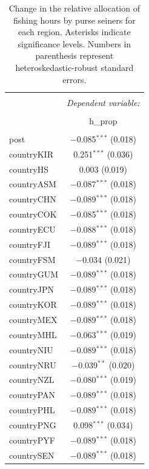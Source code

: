 \documentclass[12pt,]{article}
\begin{document}
\begin{table}[!htbp] \centering 
  \caption{\label{tab:disp_mod}Change in the relative allocation of fishing hours by purse seiners for each region. Asterisks indicate significance levels. Numbers in parenthesis represent heteroskedastic-robust standard errors.} 
  \label{} 
\begin{tabular}{@{\extracolsep{5pt}}lc} 
\\[-1.8ex]\hline 
\hline \\[-1.8ex] 
 & \multicolumn{1}{c}{\textit{Dependent variable:}} \\ 
\cline{2-2} 
\\[-1.8ex] & h\_prop \\ 
\hline \\[-1.8ex] 
 post & $-$0.085$^{***}$ (0.018) \\ 
  countryKIR & 0.251$^{***}$ (0.036) \\ 
  countryHS & 0.003 (0.019) \\ 
  countryASM & $-$0.087$^{***}$ (0.018) \\ 
  countryCHN & $-$0.089$^{***}$ (0.018) \\ 
  countryCOK & $-$0.085$^{***}$ (0.018) \\ 
  countryECU & $-$0.088$^{***}$ (0.018) \\ 
  countryFJI & $-$0.089$^{***}$ (0.018) \\ 
  countryFSM & $-$0.034 (0.021) \\ 
  countryGUM & $-$0.089$^{***}$ (0.018) \\ 
  countryJPN & $-$0.089$^{***}$ (0.018) \\ 
  countryKOR & $-$0.089$^{***}$ (0.018) \\ 
  countryMEX & $-$0.089$^{***}$ (0.018) \\ 
  countryMHL & $-$0.063$^{***}$ (0.019) \\ 
  countryNIU & $-$0.089$^{***}$ (0.018) \\ 
  countryNRU & $-$0.039$^{**}$ (0.020) \\ 
  countryNZL & $-$0.080$^{***}$ (0.019) \\ 
  countryPAN & $-$0.089$^{***}$ (0.018) \\ 
  countryPHL & $-$0.089$^{***}$ (0.018) \\ 
  countryPNG & 0.098$^{***}$ (0.034) \\ 
  countryPYF & $-$0.089$^{***}$ (0.018) \\ 
  countrySEN & $-$0.089$^{***}$ (0.018) \\ 

\end{tabular}
\end{table}
\end{document}
